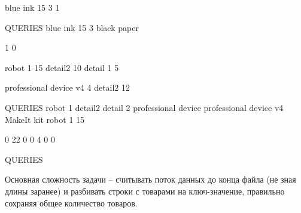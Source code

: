 \begin{myverbbox}[\small]{\vinput}
    blue ink 15 3 1

    QUERIES
    blue ink 15 3
    black paper
\end{myverbbox}

\begin{myverbbox}[\small]{\voutput}
    1
    0
\end{myverbbox}


\begin{myverbbox}[\small]{\vinput}
    robot 1 15
    detail2 10
    detail 1 5
    
    professional device v4 4
    detail2 12
    
    QUERIES
    robot  1
    detail2
    detail 2
    professional device
    professional device v4
    MakeIt kit
    robot 1 15
\end{myverbbox}

\begin{myverbbox}[\small]{\voutput}
    0
    22
    0
    0
    4
    0
    0
\end{myverbbox}


\begin{myverbbox}[\small]{\vinput}
    QUERIES
\end{myverbbox}

\begin{myverbbox}[\small]{\voutput}
    
\end{myverbbox}

\solutionSection

Основная сложность задачи -- считывать поток данных до конца файла (не зная длины заранее) и разбивать строки с товарами на ключ-значение, правильно сохраняя общее количество товаров.

